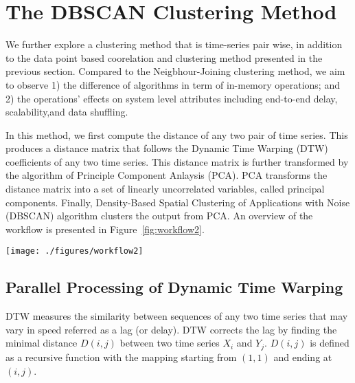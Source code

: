 \chapter{The DBSCAN Clustering Method}

We further explore a clustering method that is time-series pair wise, in addition to the data point based coorelation and clustering method presented in the previous section. Compared to the Neigbhour-Joining clustering method, we aim to observe 1) the difference of algorithms in term of in-memory operations; and 2) the operations' effects on system level attributes including end-to-end delay, scalability,and data shuffling. 

In this method, we first compute the distance of any two pair of time series. This produces a distance matrix that follows the Dynamic Time Warping (DTW) coefficients of any two time series. This distance matrix is further transformed by the algorithm of Principle Component Anlaysis (PCA). PCA transforms the distance matrix into a set of linearly uncorrelated variables,  called principal components. Finally, Density-Based Spatial Clustering of Applications with Noise (DBSCAN) algorithm clusters the output from PCA. An overview of the workflow is presented in Figure~\ref{fig:workflow2}.

\begin{figure*}
	\texttt{[image: ./figures/workflow2]}
	{\caption{An overview of the DBSCAN clustering method. The left most represents the distance matrix of the input time series measured with DTW. PCA is then applied to reduce the dimentionality. These pairs of principle components from PCA are then projected into a two dimensional space where $X$ axis is component 1 and $Y$ axis is component 2. Finally, DBSCAN is applied to these points to find clusters.}
		\label{fig:workflow2}}
\end{figure*} 


\section{Parallel Processing of Dynamic Time Warping}

DTW measures the similarity between sequences of any two time series that may vary in speed referred as a lag (or delay).  DTW corrects the lag by finding the minimal distance $D(i,j)$ between two time series $X_i$ and $Y_j$. $D(i,j)$ is defined as a recursive function with the mapping starting from $(1,1)$ and ending at $(i,j)$. 

